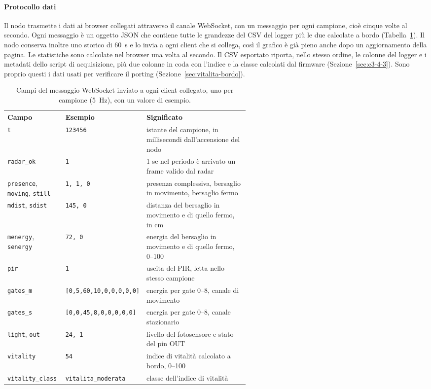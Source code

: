 \paragraph{Protocollo dati} Il nodo trasmette i dati ai browser collegati attraverso il
canale WebSocket, con un messaggio per ogni campione, cioè cinque volte al secondo. Ogni
messaggio è un oggetto JSON che contiene tutte le grandezze del CSV del logger più le due
calcolate a bordo (Tabella~\ref{tab:webui-messaggio}). Il nodo conserva inoltre uno storico
di 60~s e lo invia a ogni client che si collega, così il grafico è già pieno anche dopo un
aggiornamento della pagina. Le statistiche sono calcolate nel browser una volta al secondo.
Il CSV esportato riporta, nello stesso ordine, le colonne del logger e i metadati dello
script di acquisizione, più due colonne in coda con l'indice e la classe calcolati dal
firmware (Sezione~\ref{sec:c3-4-3}). Sono proprio questi i dati usati per verificare il
porting (Sezione~\ref{sec:vitalita-bordo}).

\begin{table}[!htbp]
\centering
\caption{Campi del messaggio WebSocket inviato a ogni client collegato, uno per campione
(5~Hz), con un valore di esempio.}
\label{tab:webui-messaggio}
\small
\begin{tabularx}{\linewidth}{@{}>{\raggedright\arraybackslash}p{0.24\linewidth}>{\raggedright\arraybackslash}p{0.33\linewidth}X@{}}
\toprule
\textbf{Campo} & \textbf{Esempio} & \textbf{Significato} \\
\midrule
\texttt{t} & \texttt{123456} & istante del campione, in millisecondi dall'accensione del nodo \\
\texttt{radar\_ok} & \texttt{1} & 1 se nel periodo è arrivato un frame valido dal radar \\
\texttt{presence}, \texttt{moving}, \texttt{still} & \texttt{1, 1, 0} & presenza complessiva, bersaglio in movimento, bersaglio fermo \\
\texttt{mdist}, \texttt{sdist} & \texttt{145, 0} & distanza del bersaglio in movimento e di quello fermo, in cm \\
\texttt{menergy}, \texttt{senergy} & \texttt{72, 0} & energia del bersaglio in movimento e di quello fermo, 0--100 \\
\texttt{pir} & \texttt{1} & uscita del PIR, letta nello stesso campione \\
\texttt{gates\_m} & \texttt{[0,5,60,10,0,0,0,0,0]} & energia per gate 0--8, canale di movimento \\
\texttt{gates\_s} & \texttt{[0,0,45,8,0,0,0,0,0]} & energia per gate 0--8, canale stazionario \\
\texttt{light}, \texttt{out} & \texttt{24, 1} & livello del fotosensore e stato del pin OUT \\
\texttt{vitality} & \texttt{54} & indice di vitalità calcolato a bordo, 0--100 \\
\texttt{vitality\_class} & \texttt{vitalita\_moderata} & classe dell'indice di vitalità \\
\bottomrule
\end{tabularx}
\end{table}

